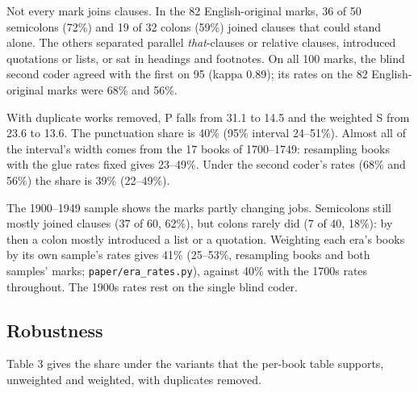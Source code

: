 \documentclass[
  11pt,
]{article}
\begin{document}
Not every mark joins clauses. In the 82 English-original marks, 36 of 50 semicolons (72\%) and 19 of 32 colons (59\%) joined clauses that could stand alone. The others separated parallel
\emph{that}-clauses or relative clauses, introduced quotations or lists, or sat in headings and footnotes. On all 100 marks, the blind second coder agreed with the first on 95 (kappa 0.89); its rates
on the 82 English-original marks were 68\% and 56\%.

With duplicate works removed, P falls from 31.1 to 14.5 and the weighted S from 23.6 to 13.6. The punctuation share is 40\% (95\% interval 24--51\%). Almost all of the interval's width comes from the
17 books of 1700--1749: resampling books with the glue rates fixed gives 23--49\%. Under the second coder's rates (68\% and 56\%) the share is 39\% (22--49\%).

The 1900--1949 sample shows the marks partly changing jobs. Semicolons still mostly joined clauses (37 of 60, 62\%), but colons rarely did (7 of 40, 18\%): by then a colon mostly introduced a list or
a quotation. Weighting each era's books by its own sample's rates gives 41\% (25--53\%, resampling books and both samples' marks; \texttt{paper/era\_rates.py}), against 40\% with the 1700s rates
throughout. The 1900s rates rest on the single blind coder.

\subsection{Robustness}\label{robustness}

Table 3 gives the share under the variants that the per-book table supports, unweighted and weighted, with duplicates removed.

\end{document}

